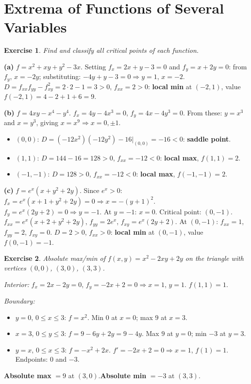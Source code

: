 \documentclass[12pt,a4paper]{article}
\theoremstyle{exstyle}
\newtheorem{exercise}{Exercise}[section]
\begin{document}
\section{Extrema of Functions of Several Variables}

\begin{exercise}
Find and classify all critical points of each function.
\end{exercise}
\begin{solbox}
\textbf{(a)} $f=x^2+xy+y^2-3x$. Setting $f_x=2x+y-3=0$ and $f_y=x+2y=0$:
from $f_y$, $x=-2y$; substituting: $-4y+y-3=0\Rightarrow y=1$, $x=-2$.
$D=f_{xx}f_{yy}-f_{xy}^2=2\cdot2-1=3>0$, $f_{xx}=2>0$: \textbf{local min} at $(-2,1)$, value $f(-2,1)=4-2+1+6=9$.

\textbf{(b)} $f=4xy-x^4-y^4$. $f_x=4y-4x^3=0$, $f_y=4x-4y^3=0$.
From these: $y=x^3$ and $x=y^3$, giving $x=x^9\Rightarrow x=0,\pm1$.
\begin{itemize}
  \item $(0,0)$: $D=(-12x^2)(-12y^2)-16\big|_{(0,0)}=-16<0$: \textbf{saddle point}.
  \item $(1,1)$: $D=144-16=128>0$, $f_{xx}=-12<0$: \textbf{local max}, $f(1,1)=2$.
  \item $(-1,-1)$: $D=128>0$, $f_{xx}=-12<0$: \textbf{local max}, $f(-1,-1)=2$.
\end{itemize}

\textbf{(c)} $f=e^x(x+y^2+2y)$. Since $e^x>0$:
$f_x=e^x(x+1+y^2+2y)=0\Rightarrow x=-(y+1)^2$.\quad $f_y=e^x(2y+2)=0\Rightarrow y=-1$.
At $y=-1$: $x=0$. Critical point: $(0,-1)$.
$f_{xx}=e^x(x+2+y^2+2y)$, $f_{yy}=2e^x$, $f_{xy}=e^x(2y+2)$.
At $(0,-1)$: $f_{xx}=1$, $f_{yy}=2$, $f_{xy}=0$.
$D=2>0$, $f_{xx}>0$: \textbf{local min} at $(0,-1)$, value $f(0,-1)=-1$.
\end{solbox}

\begin{exercise}
Absolute max/min of $f(x,y)=x^2-2xy+2y$ on the triangle with vertices $(0,0)$, $(3,0)$, $(3,3)$.
\end{exercise}
\begin{solbox}
\emph{Interior:} $f_x=2x-2y=0$, $f_y=-2x+2=0\Rightarrow x=1$, $y=1$. $f(1,1)=1$.

\emph{Boundary:}
\begin{itemize}
  \item $y=0$, $0\le x\le3$: $f=x^2$. Min $0$ at $x=0$; max $9$ at $x=3$.
  \item $x=3$, $0\le y\le3$: $f=9-6y+2y=9-4y$. Max $9$ at $y=0$; min $-3$ at $y=3$.
  \item $y=x$, $0\le x\le3$: $f=-x^2+2x$. $f'=-2x+2=0\Rightarrow x=1$, $f(1)=1$. Endpoints: $0$ and $-3$.
\end{itemize}
\textbf{Absolute max} $=9$ at $(3,0)$.\quad \textbf{Absolute min} $=-3$ at $(3,3)$.
\end{solbox}
\end{document}
